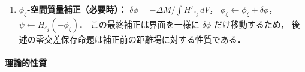 \begin{tcolorbox}[algbox, title={ξ-SDF 再初期化アルゴリズム}]
\begin{enumerate}
        （= $C_\varepsilon$，§\ref{sec:cls_advection} 参照）を用いて
        \begin{equation}
          \psi_{\mathrm{new}}(i,j) = H_{\varepsilon_\xi}\!\bigl(-\phi_\xi(i,j)\bigr)
          = \frac{1}{1+\exp\!\bigl(\phi_\xi(i,j)/\varepsilon_\xi\bigr)}
          \label{eq:xi_sdf_psi}
        \end{equation}
  \item \textbf{$\phi_\xi$-空間質量補正（必要時）：}
        $\delta\phi = -\Delta M / \int H'_{\varepsilon_\xi}\,dV$，
        $\phi_\xi \leftarrow \phi_\xi + \delta\phi$，
        $\psi \leftarrow H_{\varepsilon_\xi}(-\phi_\xi)$．
        この最終補正は界面を一様に $\delta\phi$ だけ移動するため，
        後述の零交差保存命題は補正前の距離場に対する性質である．
\end{enumerate}
\end{tcolorbox}

\paragraph*{理論的性質}

